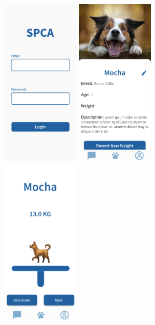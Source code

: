 \begin{figure}
    \centering
    \includegraphics[width=0.33333\textwidth]{images/mobile/mobile1.png}\hfill
    \includegraphics[width=0.33333\textwidth]{images/mobile/mobile2.png}\hfill
    \includegraphics[width=0.33333\textwidth]{images/mobile/mobile3.png}\\[\smallskipamount]

\end{figure}
